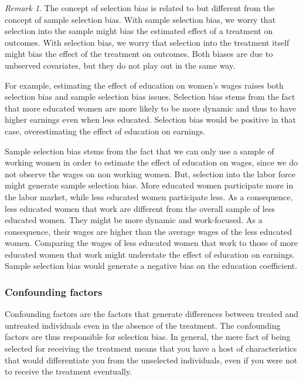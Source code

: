 \documentclass[
]{book}
\theoremstyle{definition}
\theoremstyle{definition}
\theoremstyle{definition}
\theoremstyle{definition}
\theoremstyle{remark}
\newtheorem*{remark}{Remark}
\begin{document}
\begin{remark}
\iffalse{} {Remark. } \fi{}The concept of selection bias is related to but different from the concept of sample selection bias.
With sample selection bias, we worry that selection into the sample might bias the estimated effect of a treatment on outcomes.
With selection bias, we worry that selection into the treatment itself might bias the effect of the treatment on outcomes.
Both biases are due to unbserved covariates, but they do not play out in the same way.

For example, estimating the effect of education on women's wages raises both selection bias and sample selection bias issues.
Selection bias stems from the fact that more educated women are more likely to be more dynamic and thus to have higher earnings even when less educated.
Selection bias would be positive in that case, overestimating the effect of education on earnings.

Sample selection bias stems from the fact that we can only use a sample of working women in order to estimate the effect of education on wages, since we do not observe the wages on non working women.
But, selection into the labor force might generate sample selection bias.
More educated women participate more in the labor market, while less educated women participate less.
As a consequence, less educated women that work are different from the overall sample of less educated women.
They might be more dynamic and work-focused.
As a consequence, their wages are higher than the average wages of the less educated women.
Comparing the wages of less educated women that work to those of more educated women that work might understate the effect of education on earnings.
Sample selection bias would generate a negative bias on the education coefficient.
\end{remark}

\hypertarget{confounding-factors}{%
\subsubsection{Confounding factors}\label{confounding-factors}}

Confounding factors are the factors that generate differences between treated and untreated individuals even in the absence of the treatment.
The confounding factors are thus responsible for selection bias.
In general, the mere fact of being selected for receiving the treatment means that you have a host of characteristics that would differentiate you from the unselected individuals, even if you were not to receive the treatment eventually.
\end{document}
